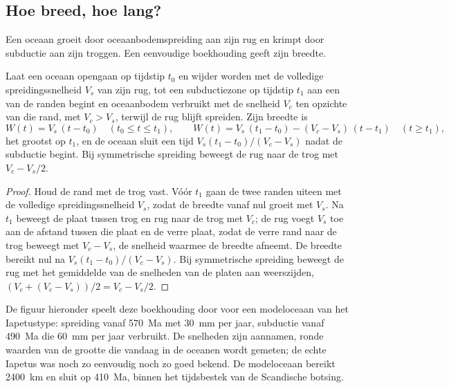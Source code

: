\subsection{Hoe breed, hoe lang?}

Een oceaan groeit door oceaanbodemspreiding aan zijn rug en krimpt door subductie aan zijn troggen.
Een eenvoudige boekhouding geeft zijn breedte.

\begin{proposition}\label{prop:b2:wilson-cycle:width}
Laat een oceaan opengaan op tijdstip $t_0$ en wijder worden met de volledige spreidingssnelheid $V_s$ van zijn rug, tot een
subductiezone op tijdstip $t_1$ aan een van de randen begint en oceaanbodem verbruikt met de snelheid $V_c$
ten opzichte van die rand, met $V_c > V_s$, terwijl de rug blijft spreiden. Zijn breedte is
\[
  W(t) = V_s\,(t - t_0) \quad (t_0 \le t \le t_1), \qquad
  W(t) = V_s\,(t_1 - t_0) - (V_c - V_s)\,(t - t_1) \quad (t \ge t_1),
\]
het grootst op $t_1$, en de oceaan sluit een tijd $V_s(t_1 - t_0)/(V_c - V_s)$ nadat de subductie
begint. Bij symmetrische spreiding beweegt de rug naar de trog met $V_c - V_s/2$.
\end{proposition}

\begin{proof}
Houd de rand met de trog vast. Vóór $t_1$ gaan de twee randen uiteen met de volledige
spreidingssnelheid $V_s$, zodat de breedte vanaf nul groeit met $V_s$. Na $t_1$ beweegt de plaat tussen
trog en rug naar de trog met $V_c$; de rug voegt $V_s$ toe aan de afstand
tussen die plaat en de verre plaat, zodat de verre rand naar de trog beweegt met $V_c - V_s$,
de snelheid waarmee de breedte afneemt. De breedte bereikt nul na $V_s(t_1 - t_0)/(V_c -
V_s)$. Bij symmetrische spreiding beweegt de rug met het gemiddelde van de snelheden van de platen aan
weerszijden, $(V_c + (V_c - V_s))/2 = V_c - V_s/2$.
\end{proof}

De figuur hieronder speelt deze boekhouding door voor een modeloceaan van het Iapetustype: spreiding vanaf
\qty{570}{Ma} met \qty{30}{mm} per jaar, subductie vanaf \qty{490}{Ma} die \qty{60}{mm} per
jaar verbruikt. De snelheden zijn aannamen, ronde waarden van de grootte die vandaag in de oceanen wordt gemeten; de
echte Iapetus was noch zo eenvoudig noch zo goed bekend. De modeloceaan bereikt \qty{2400}{km}
en sluit op \qty{410}{Ma}, binnen het tijdsbestek van de Scandische botsing.

